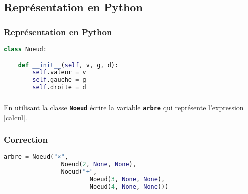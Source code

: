 \documentclass[svgnames,11pt]{beamer}
\begin{document}
\subsection{Représentation en Python}
\begin{frame}[fragile]
    \frametitle{Représentation en Python}

    \begin{center}
        \begin{lstlisting}[language=Python , basicstyle=\ttfamily\small, xleftmargin=1em, xrightmargin=1em]
class Noeud:

    def __init__(self, v, g, d):
        self.valeur = v
        self.gauche = g
        self.droite = d
\end{lstlisting}
        \label{CODE}
    \end{center}

\end{frame}
\begin{frame}
    \frametitle{}
    \begin{center}
        \label{calcul}
    \end{center}
\begin{activite}
En utilisant la classe \textbf{\texttt{Noeud}} écrire la variable \textbf{\texttt{arbre}} qui représente l'expression \ref{calcul}.
\end{activite}

\end{frame}
\begin{frame}[fragile]
    \frametitle{Correction}

\begin{center}
\begin{lstlisting}[language=Python , basicstyle=\ttfamily\small, xleftmargin=1em, xrightmargin=0em]
arbre = Noeud("×",
                Noeud(2, None, None),
                Noeud("+",
                        Noeud(3, None, None),
                        Noeud(4, None, None)))
\end{lstlisting}
\end{center}    

\end{frame}
\end{document}
